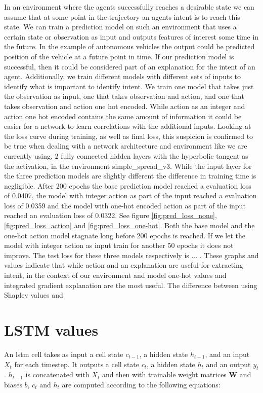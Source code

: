 \documentclass[UKenglish]{uiomasterthesis}
\begin{document}
In an environment where the agents successfully reaches a desirable state we can assume that at some point in the trajectory an agents intent is to reach this state. We can train a prediction model on such an environment that uses a certain state or observation as input and outputs features of interest some time in the future. In the example of autonomous vehicles the output could be predicted position of the vehicle at a future point in time. If our prediction model is successful, then it could be considered part of an explanation for the intent of an agent.
Additionally, we train different models with different sets of inputs to identify what is important to identify intent. We train one model that takes just the observation as input, one that takes observation and action, and one that takes observation and action one hot encoded. While action as an integer and action one hot encoded contains the same amount of information it could be easier for a network to learn correlations with the additional inputs. Looking at the loss curve during training, as well as final loss, this suspicion is confirmed to be true when dealing with a network architecture and environment like we are currently using, 2 fully connected hidden layers with the hyperbolic tangent as the activation, in the environment simple\_spread\_v3. While the input layer for the three prediction models are slightly different the difference in training time is negligible. 
After 200 epochs the base prediction model reached a evaluation loss of 0.0407, the model with integer action as part of the input reached a evaluation loss of 0.0359 and the model with one-hot encoded action as part of the input reached an evaluation loss of 0.0322. See figure \ref{fig:pred_loss_none}, \ref{fig:pred_loss_action} and \ref{fig:pred_loss_one-hot}. Both the base model and the one-hot action model stagnate long before 200 epochs is reached. If we let the model with integer action as input train for another 50 epochs it does not improve. The test loss for these three models respectively is ... . These graphs and values indicate that while action and an explanation are useful for extracting intent, in the context of our environment and model one-hot values and integrated gradient explanation are the most useful. The difference between using Shapley values and


\section{LSTM values}
An \ac{lstm} cell takes as input a cell state $c_{t-1}$, a hidden state $h_{t-1}$, and an input $X_t$ for each timestep. It outputs a cell state $c_{t}$, a hidden state $h_{t}$ and an output $y_t$. $h_{t-1}$ is concatenated with $X_t$ and then with trainable weight matrices $\textbf{W}$ and biases $b$, $c_t$ and $h_t$ are computed according to the following equations:
\end{document}
